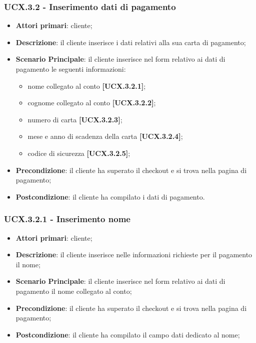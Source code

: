 \subsubsection{UCX.3.2 - Inserimento dati di pagamento}
\begin{itemize}
\item \textbf{Attori primari}: cliente;
\item \textbf{Descrizione}: il cliente inserisce i dati relativi alla sua carta di pagamento;
\item \textbf{Scenario Principale}: il cliente inserisce nel form relativo ai dati di pagamento le seguenti informazioni:
\begin{itemize}
	\item nome collegato al conto \textbf{[UCX.3.2.1]};
	\item cognome collegato al conto \textbf{[UCX.3.2.2]};
	\item numero di carta \textbf{[UCX.3.2.3]};
	\item mese e anno di scadenza della carta \textbf{[UCX.3.2.4]};
	\item codice di sicurezza \textbf{[UCX.3.2.5]};
\end{itemize}
\item \textbf{Precondizione}: il cliente ha superato il checkout e si trova nella pagina di pagamento;
\item \textbf{Postcondizione}: il cliente ha compilato i dati di pagamento.
\end{itemize}

\subsubsection{UCX.3.2.1 - Inserimento nome}
\begin{itemize}
\item \textbf{Attori primari}: cliente;
\item \textbf{Descrizione}: il cliente inserisce nelle informazioni richieste per il pagamento il nome;
\item \textbf{Scenario Principale}: il cliente inserisce nel form relativo ai dati di pagamento il nome collegato al conto;
\item \textbf{Precondizione}: il cliente ha superato il checkout e si trova nella pagina di pagamento;
\item \textbf{Postcondizione}: il cliente ha compilato il campo dati dedicato al nome;
\end{itemize}

